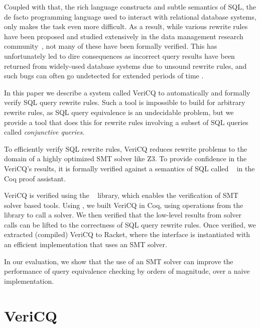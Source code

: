 Coupled with that, the rich language constructs and subtle semantics of
SQL, the de facto programming language used to interact with relational 
database systems, 
only makes the task even more difficult.
As a result, while various rewrite rules
have been proposed and studied extensively 
in the data management research community~\cite{MumickFPR90SIGMOD, Muralikrishna92VLDB, LevyMS94VLDB, SeshadriHPLRSSS96SIGMOD},
not many of these have been formally verified. This has unfortunately 
led to dire consequences as incorrect query results have been returned 
from widely-used database systems due to unsound rewrite rules, and 
such bugs can often go undetected for extended periods of time
\cite{GanskiW87SIGMOD, MySQLBug, PostgresBug}.

In this paper we describe a system called VeriCQ to automatically and formally verify SQL query rewrite rules.
Such a tool is impossible to build for arbitrary rewrite rules, as SQL query equivalence is an 
undecidable problem, but we provide a tool that does this for rewrite rules involving 
a subset of SQL queries called \emph{conjunctive queries}.

To efficiently verify SQL rewrite rules, VeriCQ reduces rewrite problems to the domain of
a highly optimized SMT solver like Z3.
%
To provide confidence in the VeriCQ's results, it is formally verified against a semantics of
SQL called \sem~\cite{hottsql} in the Coq proof assistant. 

VeriCQ is verified using the \SpaceSearch~\cite{SpaceSearch} library, which enables the verification of 
SMT solver based tools. 
%
Using \SpaceSearch, we built VeriCQ in Coq, using operations from the
\SpaceSearch library to call a solver.
%
We then verified that the low-level results from solver calls can
be lifted to the correctness of SQL query rewrite rules.
%
Once verified, we extracted (compiled) VeriCQ to Racket,
where the \SpaceSearch interface is instantiated with an efficient
implementation that uses an SMT solver.

In our evaluation, we show that the use of an SMT
solver can improve the performance of query equivalence checking by
orders of magnitude, over a naive implementation.


\section{VeriCQ}

